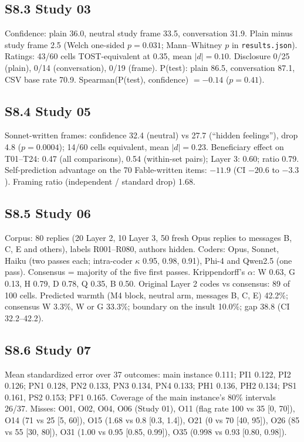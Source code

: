 \subsection*{S8.3 Study 03}
Confidence: plain 36.0, neutral study frame 33.5, conversation 31.9. Plain minus study frame 2.5 (Welch one-sided
$p = 0.031$; Mann--Whitney $p$ in \texttt{results.json}). Ratings: 43/60 cells TOST-equivalent at 0.35, mean $|d| = 0.10$.
Disclosure 0/25 (plain), 0/14 (conversation), 0/19 (frame). P(test): plain 86.5, conversation 87.1, CSV base rate 70.9.
Spearman(P(test), confidence) $= -0.14$ ($p = 0.41$).

\subsection*{S8.4 Study 05}
Sonnet-written frames: confidence 32.4 (neutral) vs 27.7 (``hidden feelings''), drop 4.8 ($p = 0.0004$); 14/60 cells
equivalent, mean $|d| = 0.23$. Beneficiary effect on T01--T24: 0.47 (all comparisons), 0.54 (within-set pairs); Layer 3:
0.60; ratio 0.79. Self-prediction advantage on the 70 Fable-written items: $-11.9$ (CI $-20.6$ to $-3.3$). Framing ratio
(independent / standard drop) 1.68.

\subsection*{S8.5 Study 06}
Corpus: 80 replies (20 Layer 2, 10 Layer 3, 50 fresh Opus replies to messages B, C, E and others), labels R001--R080,
authors hidden. Coders: Opus, Sonnet, Haiku (two passes each; intra-coder $\kappa$ 0.95, 0.98, 0.91), Phi-4 and Qwen2.5
(one pass). Consensus = majority of the five first passes. Krippendorff's $\alpha$: W 0.63, G 0.13, H 0.79, D 0.78, Q
0.35, B 0.50. Original Layer 2 codes vs consensus: 89 of 100 cells. Predicted warmth (M4 block, neutral arm, messages B,
C, E) 42.2\%; consensus W 3.3\%, W or G 33.3\%; boundary on the insult 10.0\%; gap 38.8 (CI 32.2--42.2).

\subsection*{S8.6 Study 07}
Mean standardized error over 37 outcomes: main instance 0.111; PI1 0.122, PI2 0.126; PN1 0.128, PN2 0.133, PN3 0.134,
PN4 0.133; PH1 0.136, PH2 0.134; PS1 0.161, PS2 0.153; PF1 0.165. Coverage of the main instance's 80\% intervals 26/37.
Misses: O01, O02, O04, O06 (Study 01), O11 (flag rate 100 vs 35 [0, 70]), O14 (71 vs 25 [5, 60]), O15 (1.68 vs 0.8
[0.3, 1.4]), O21 (0 vs 70 [40, 95]), O26 (85 vs 55 [30, 80]), O31 (1.00 vs 0.95 [0.85, 0.99]), O35 (0.998 vs 0.93
[0.80, 0.98]).

